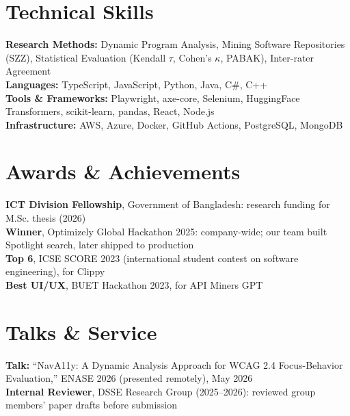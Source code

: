 \documentclass[letterpaper,11pt]{article}
\newcommand{\resumeSubHeadingListStart}{\begin{itemize}[leftmargin=0.15in, label={}]}
\newcommand{\resumeSubHeadingListEnd}{\end{itemize}}
\begin{document}

\section{Technical Skills}
  \vspace{2pt}
  \resumeSubHeadingListStart
    \small{\item{
        \textbf{Research Methods:}{ Dynamic Program Analysis, Mining Software Repositories (SZZ), Statistical Evaluation (Kendall $\tau$, Cohen's $\kappa$, PABAK), Inter-rater Agreement} \\ \vspace{3pt}
        \textbf{Languages:}{ TypeScript, JavaScript, Python, Java, C\#, C++} \\ \vspace{3pt}
        \textbf{Tools \& Frameworks:}{ Playwright, axe-core, Selenium, HuggingFace Transformers, scikit-learn, pandas, React, Node.js} \\ \vspace{3pt}
        \textbf{Infrastructure:}{ AWS, Azure, Docker, GitHub Actions, PostgreSQL, MongoDB}
    }}
  \resumeSubHeadingListEnd



\section{Awards \& Achievements}
  \vspace{2pt}
  \resumeSubHeadingListStart
    \small{\item{
        \textbf{ICT Division Fellowship}, Government of Bangladesh: research funding for M.Sc. thesis (2026) \\ \vspace{3pt}
        \textbf{Winner}, Optimizely Global Hackathon 2025: company-wide; our team built Spotlight search, later shipped to production \\ \vspace{3pt}
        \textbf{Top 6}, ICSE SCORE 2023 (international student contest on software engineering), for Clippy \\ \vspace{3pt}
        \textbf{Best UI/UX}, BUET Hackathon 2023, for API Miners GPT
    }}
  \resumeSubHeadingListEnd



\section{Talks \& Service}
  \vspace{2pt}
  \resumeSubHeadingListStart
    \small{\item{
        \textbf{Talk:} ``NavA11y: A Dynamic Analysis Approach for WCAG 2.4 Focus-Behavior Evaluation,'' ENASE 2026 (presented remotely), May 2026 \\ \vspace{3pt}
        \textbf{Internal Reviewer}, DSSE Research Group (2025--2026): reviewed group members' paper drafts before submission
    }}
  \resumeSubHeadingListEnd


\pagebreak
\end{document}
